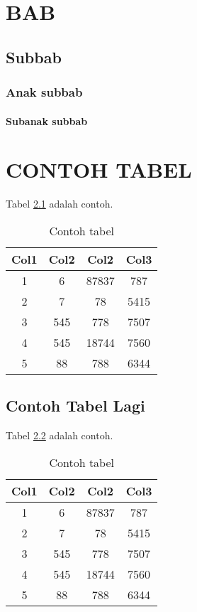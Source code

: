 \chapter{BAB}
\lipsum[3]
\section{Subbab}
\lipsum[5]
\subsection{Anak subbab}
\lipsum[6]
\subsubsection{Subanak subbab}
\lipsum[7]


\chapter{CONTOH TABEL}
Tabel \ref{table:1} adalah contoh.
\begin{table}[h]
\centering
\begin{tabular}{||c c c c||} 
 \hline
 Col1 & Col2 & Col2 & Col3 \\ [0.5ex] 
 \hline\hline
 1 & 6 & 87837 & 787 \\ 
 2 & 7 & 78 & 5415 \\
 3 & 545 & 778 & 7507 \\
 4 & 545 & 18744 & 7560 \\
 5 & 88 & 788 & 6344 \\ [1ex] 
 \hline
\end{tabular}
\caption{Contoh tabel}
\label{table:1}
\end{table}

\section{Contoh Tabel Lagi}
Tabel \ref{table:2} adalah contoh.
\begin{table}[h!]
\centering
\begin{tabular}{||c c c c||} 
 \hline
 Col1 & Col2 & Col2 & Col3 \\ [0.5ex] 
 \hline\hline
 1 & 6 & 87837 & 787 \\ 
 2 & 7 & 78 & 5415 \\
 3 & 545 & 778 & 7507 \\
 4 & 545 & 18744 & 7560 \\
 5 & 88 & 788 & 6344 \\ [1ex] 
 \hline
\end{tabular}
\caption{Contoh tabel}
\label{table:2}
\end{table}

